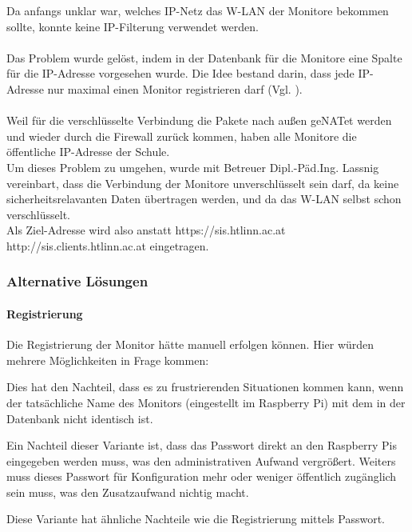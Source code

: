 Da anfangs unklar war, welches IP-Netz das W-LAN der Monitore bekommen sollte, konnte keine IP-Filterung verwendet werden.\\
\\
Das Problem wurde gelöst, indem in der Datenbank für die Monitore eine Spalte für die IP-Adresse vorgesehen wurde. Die Idee bestand darin, dass jede IP-Adresse nur maximal einen Monitor registrieren darf (Vgl. ).\\
\\
Weil für die verschlüsselte Verbindung die Pakete nach außen geNATet werden und wieder durch die Firewall zurück kommen, haben alle Monitore die öffentliche IP-Adresse der Schule.\\
Um dieses Problem zu umgehen, wurde mit Betreuer Dipl.-Päd.Ing. Lassnig vereinbart, dass die Verbindung der Monitore unverschlüsselt sein darf, da keine sicherheitsrelavanten Daten übertragen werden, und da das W-LAN selbst schon verschlüsselt.\\
Als Ziel-Adresse wird also anstatt https://sis.htlinn.ac.at http://sis.clients.htlinn.ac.at eingetragen.

\newpage
\subsubsection{Alternative Lösungen}

\paragraph{Registrierung\\}
\label{sec:content_solutions_monitors_alt_reg}

Die Registrierung der Monitor hätte manuell erfolgen können. Hier würden mehrere Möglichkeiten in Frage kommen:

\begin{description}[style=nextline]
	\item[Registrierung nur vom Administrator-Interface aus]
		Dies hat den Nachteil, dass es zu frustrierenden Situationen kommen kann, wenn der tatsächliche Name des Monitors (eingestellt im Raspberry Pi) mit dem in der Datenbank nicht identisch ist.\\
	\item[Registrierung mittels Passwort]
		Ein Nachteil dieser Variante ist, dass das Passwort direkt an den Raspberry Pis eingegeben werden muss, was den administrativen Aufwand vergrößert.
		Weiters muss dieses Passwort für Konfiguration mehr oder weniger öffentlich zugänglich sein muss, was den Zusatzaufwand nichtig macht.
	\item[Registrierung mittels Cookie-Hash]
		Diese Variante hat ähnliche Nachteile wie die Registrierung mittels Passwort.
\end{description}

